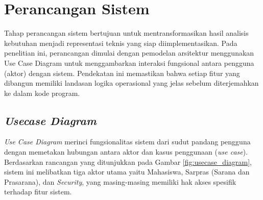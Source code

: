 \section{Perancangan Sistem}
Tahap perancangan sistem bertujuan untuk mentransformasikan hasil analisis kebutuhan menjadi representasi teknis yang siap diimplementasikan. Pada penelitian ini, perancangan dimulai dengan pemodelan arsitektur menggunakan Use Case Diagram untuk menggambarkan interaksi fungsional antara pengguna (aktor) dengan sistem. Pendekatan ini memastikan bahwa setiap fitur yang dibangun memiliki landasan logika operasional yang jelas sebelum diterjemahkan ke dalam kode program.

\subsection{\textit{Usecase Diagram}}
\textit{Use Case Diagram} merinci fungsionalitas sistem dari sudut pandang pengguna dengan memetakan hubungan antara aktor dan kasus penggunaan (\textit{use case}). Berdasarkan rancangan yang ditunjukkan pada Gambar \ref{fig:usecase_diagram}, sistem ini melibatkan tiga aktor utama yaitu Mahasiswa, Sarpras (Sarana dan Prasarana), dan \textit{Security}, yang masing-masing memiliki hak akses spesifik terhadap fitur sistem.

